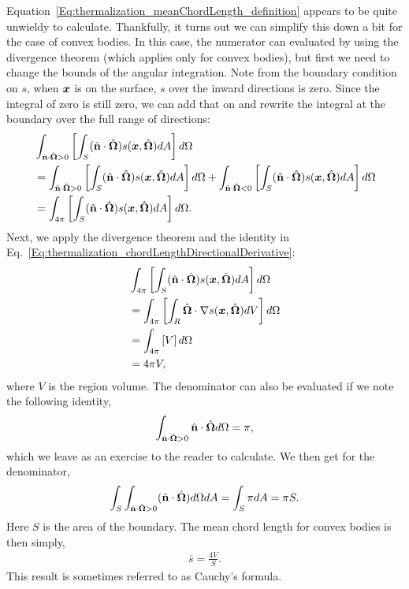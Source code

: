 Equation~\eqref{Eq:thermalization_meanChordLength_definition} appears to be quite unwieldy to calculate. Thankfully, it turns out we can simplify this down a bit for the case of convex bodies. In this case, the numerator can evaluated by using the divergence theorem (which applies only for convex bodies), but first we need to change the bounds of the angular integration. Note from the boundary condition on $s$, when $\bm{x}$ is on the surface, $s$ over the inward directions is zero. Since the integral of zero is still zero, we can add that on and rewrite the integral at the boundary over the full range of directions:
\begin{align}
  &\int_{\hat{\mathbf{n}} \cdot \hat{\mathbf{\Omega}} > 0} \left[ \displaystyle\int_{S} ( \hat{\mathbf{n}} \cdot \hat{\mathbf{\Omega}} ) s( \bm{x}, \hat{\mathbf{\Omega}} ) dA \right] d\Omega \nonumber \\
  &= \int_{\hat{\mathbf{n}} \cdot \hat{\mathbf{\Omega}} > 0} \left[ \displaystyle\int_{S} ( \hat{\mathbf{n}} \cdot \hat{\mathbf{\Omega}} ) s( \bm{x}, \hat{\mathbf{\Omega}} ) dA \right] d\Omega + \int_{\hat{\mathbf{n}} \cdot \hat{\mathbf{\Omega}} < 0} \left[ \displaystyle\int_{S} ( \hat{\mathbf{n}} \cdot \hat{\mathbf{\Omega}} ) s( \bm{x}, \hat{\mathbf{\Omega}} ) dA \right] d\Omega \nonumber \\
  &= \int_{4\pi} \left[ \displaystyle\int_{S} ( \hat{\mathbf{n}} \cdot \hat{\mathbf{\Omega}} ) s( \bm{x}, \hat{\mathbf{\Omega}} ) dA \right] d\Omega . \nonumber 
\end{align}
Next, we apply the divergence theorem and the identity in Eq.~\eqref{Eq:thermalization_chordLengthDirectionalDerivative}:
\begin{align}
  &\int_{4\pi} \left[ \displaystyle\int_{S} ( \hat{\mathbf{n}} \cdot \hat{\mathbf{\Omega}} ) s( \bm{x}, \hat{\mathbf{\Omega}} ) dA \right] d\Omega \nonumber \\
  &= \int_{{4\pi}} \left[ \displaystyle\int_{R} \hat{\mathbf{\Omega}} \cdot \nabla s( \bm{x}, \hat{\mathbf{\Omega}} ) dV \right] d\Omega \nonumber \\
  &= \int_{{4\pi}} \left[ V \right] d\Omega \nonumber \\
  &= 4\pi V , \label{Eq:thermalization_meanChordLengthNumerator}
\end{align}
where $V$ is the region volume. The denominator can also be evaluated if we note the following identity,
\begin{align}
  \int_{\hat{\mathbf{n}} \cdot \hat{\mathbf{\Omega}} > 0} \hat{\mathbf{n}} \cdot \hat{\mathbf{\Omega}} d\Omega = \pi ,
\end{align}
which we leave as an exercise to the reader to calculate. We then get for the denominator,
\begin{align}
  \displaystyle\int_{S} \int_{\hat{\mathbf{n}} \cdot \hat{\mathbf{\Omega}} > 0} ( \hat{\mathbf{n}} \cdot \hat{\mathbf{\Omega}} ) d\Omega dA = \displaystyle\int_{S} \pi dA = \pi S.
\end{align}
Here $S$ is the area of the boundary. The mean chord length for convex bodies is then simply,
\begin{align}
  \overline{s} = \frac{ 4 V }{ S }. \label{Eq:thermalization_meanChordLength_convexBody}
\end{align}
This result is sometimes referred to as Cauchy's formula.

